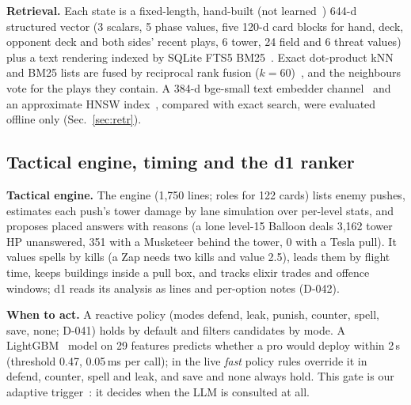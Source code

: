 \textbf{Retrieval.} Each state is a fixed-length, hand-built (not learned~\cite{lim2026l02}) 644-d structured vector (3 scalars, 5 phase values, five 120-d card blocks for hand, deck, opponent deck and both sides' recent plays, 6 tower, 24 field and 6 threat values) plus a text rendering indexed by SQLite FTS5 BM25~\cite{robertson2009bm25}. Exact dot-product kNN and BM25 lists are fused by reciprocal rank fusion ($k=60$)~\cite{cormack2009rrf,cap6938L09}, and the neighbours vote for the plays they contain. A 384-d bge-small text embedder channel~\cite{xiao2023cpack,lim2026l03} and an approximate HNSW index~\cite{malkov2020hnsw,cap6938L09}, compared with exact search, were evaluated offline only (Sec.~\ref{sec:retr}). %

\subsection{Tactical engine, timing and the d1 ranker}
\textbf{Tactical engine.} The engine (1,750 lines; roles for 122 cards) lists enemy pushes, estimates each push's tower damage by lane simulation over per-level stats, and proposes placed answers with reasons (a lone level-15 Balloon deals 3,162 tower HP unanswered, 351 with a Musketeer behind the tower, 0 with a Tesla pull). It values spells by kills (a Zap needs two kills and value 2.5), leads them by flight time, keeps buildings inside a pull box, and tracks elixir trades and offence windows; d1 reads its analysis as  lines and per-option notes (D-042). %

\textbf{When to act.} A reactive policy (modes defend, leak, punish, counter, spell, save, none; D-041) holds by default and filters candidates by mode. A LightGBM~\cite{ke2017lightgbm} model on 29 features predicts whether a pro would deploy within 2\,s (threshold 0.47, 0.05\,ms per call); in the live \emph{fast} policy rules override it in defend, counter, spell and leak, and save and none always hold. This gate is our adaptive trigger~\cite{jiang2023flare,jeong2024adaptiverag,lim2026l12}: it decides when the LLM is consulted at all. %


